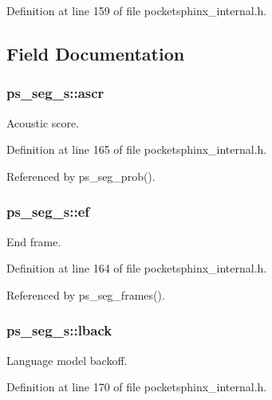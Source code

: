 \-Definition at line 159 of file pocketsphinx\-\_\-internal.\-h.



\subsection{\-Field \-Documentation}
\subsubsection[{ascr}]{ {\bf ps\-\_\-seg\-\_\-s\-::ascr}}\label{structps__seg__s_a6f7706ec4c0d0ec8ecafaf0f29f41f4b}


\-Acoustic score. 



\-Definition at line 165 of file pocketsphinx\-\_\-internal.\-h.



\-Referenced by ps\-\_\-seg\-\_\-prob().

\subsubsection[{ef}]{ {\bf ps\-\_\-seg\-\_\-s\-::ef}}\label{structps__seg__s_ab25ecc6af8d2695c6097cf7e934eadd4}


\-End frame. 



\-Definition at line 164 of file pocketsphinx\-\_\-internal.\-h.



\-Referenced by ps\-\_\-seg\-\_\-frames().

\subsubsection[{lback}]{ {\bf ps\-\_\-seg\-\_\-s\-::lback}}\label{structps__seg__s_a4d86c21f1ed2dc3eb3b1b1b37ce9bb48}


\-Language model backoff. 



\-Definition at line 170 of file pocketsphinx\-\_\-internal.\-h.



